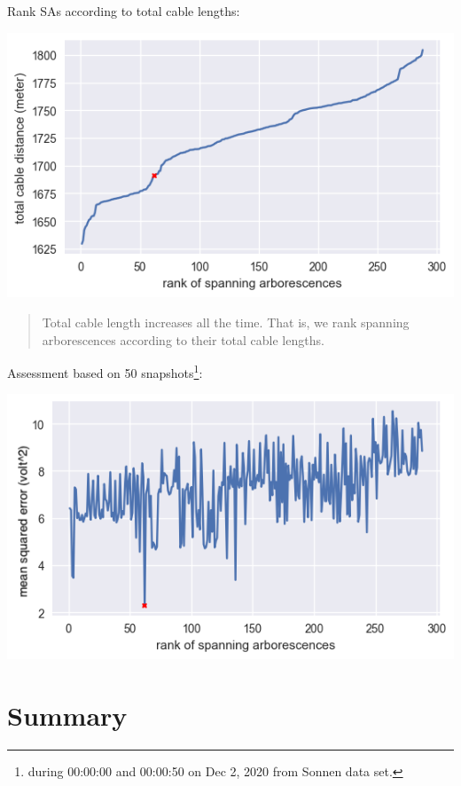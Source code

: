 \documentclass[
]{book}
\begin{document}
Rank SAs according to total cable lengths:

\begin{center}\includegraphics{Pictures/distances_288} \end{center}

\begin{quote}
Total cable length increases all the time. That is, we rank spanning
arborescences according to their total cable lengths.
\end{quote}

Assessment based on 50 snapshots\footnote{during 00:00:00 and 00:00:50 on Dec 2, 2020
  from Sonnen data set.}:

\begin{center}\includegraphics{Pictures/errors_288} \end{center}

\hypertarget{summary}{%
\section{Summary}\label{summary}}
\end{document}
